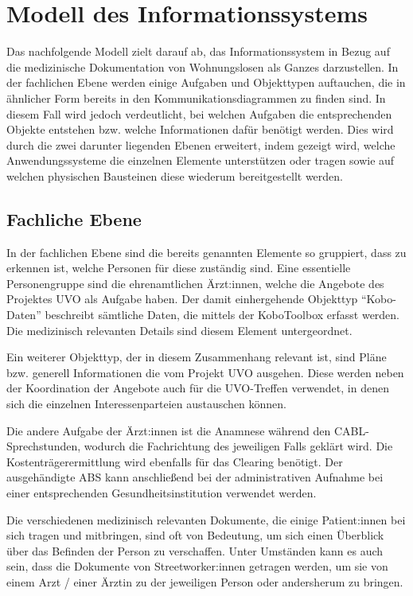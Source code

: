 \section{Modell des Informationssystems}

Das nachfolgende Modell zielt darauf ab, das Informationssystem in Bezug auf die medizinische Dokumentation von Wohnungslosen als Ganzes darzustellen. In der fachlichen Ebene werden einige Aufgaben und Objekttypen auftauchen, die in ähnlicher Form bereits in den Kommunikationsdiagrammen zu finden sind. In diesem Fall wird jedoch verdeutlicht, bei welchen Aufgaben die entsprechenden Objekte entstehen bzw. welche Informationen dafür benötigt werden. Dies wird durch die zwei darunter liegenden Ebenen erweitert, indem gezeigt wird, welche Anwendungssysteme die einzelnen Elemente unterstützen oder tragen sowie auf welchen physischen Bausteinen diese wiederum bereitgestellt werden.

\subsection{Fachliche Ebene}

In der fachlichen Ebene sind die bereits genannten Elemente so gruppiert, dass zu erkennen ist, welche Personen für diese zuständig sind. Eine essentielle Personengruppe sind die ehrenamtlichen Ärzt:innen, welche die Angebote des Projektes \ac{UVO} als Aufgabe haben. Der damit einhergehende Objekttyp \enquote{Kobo-Daten} beschreibt sämtliche Daten, die mittels der KoboToolbox erfasst werden. Die medizinisch relevanten Details sind diesem Element untergeordnet.

Ein weiterer Objekttyp, der in diesem Zusammenhang relevant ist, sind Pläne bzw. generell Informationen die vom Projekt \ac{UVO} ausgehen. Diese werden neben der Koordination der Angebote auch für die UVO-Treffen verwendet, in denen sich die einzelnen Interessenparteien austauschen können.

Die andere Aufgabe der Ärzt:innen ist die Anamnese während den CABL-Sprechstunden, wodurch die Fachrichtung des jeweiligen Falls geklärt wird. Die Kostenträgerermittlung wird ebenfalls für das Clearing benötigt. Der ausgehändigte \ac{ABS} kann anschließend bei der administrativen Aufnahme bei einer entsprechenden Gesundheitsinstitution verwendet werden.

Die verschiedenen medizinisch relevanten Dokumente, die einige Patient:innen bei sich tragen und mitbringen, sind oft von Bedeutung, um sich einen Überblick über das Befinden der Person zu verschaffen. Unter Umständen kann es auch sein, dass die Dokumente von Streetworker:innen getragen werden, um sie von einem Arzt / einer Ärztin zu der jeweiligen Person oder andersherum zu bringen.

